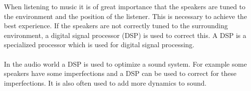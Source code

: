 When listening to music it is of great importance that the speakers are tuned to the environment and the position of the listener. This is necessary to achieve the best experience. If the speakers are not correctly tuned to the surrounding environment, a digital signal processor (DSP) is used to correct this. A DSP is a specialized processor which is used for digital signal processing.  \\
\\
In the audio world a DSP is used to optimize a sound system. For example some speakers have some imperfections and a DSP can be used to correct for these imperfections. It is also often used to add more dynamics to sound.
